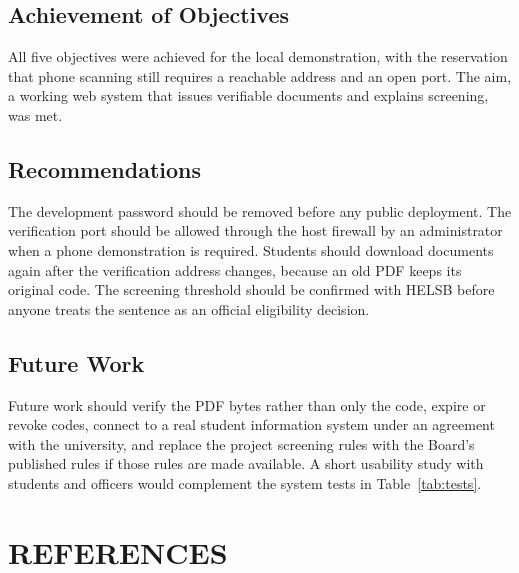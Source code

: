 \documentclass[12pt,a4paper]{report}
\begin{document}
\section{Achievement of Objectives}
All five objectives were achieved for the local demonstration, with the reservation that phone scanning still requires a reachable address and an open port. The aim, a working web system that issues verifiable documents and explains screening, was met.

\section{Recommendations}
The development password should be removed before any public deployment. The verification port should be allowed through the host firewall by an administrator when a phone demonstration is required. Students should download documents again after the verification address changes, because an old PDF keeps its original code. The screening threshold should be confirmed with HELSB before anyone treats the sentence as an official eligibility decision.

\section{Future Work}
Future work should verify the PDF bytes rather than only the code, expire or revoke codes, connect to a real student information system under an agreement with the university, and replace the project screening rules with the Board's published rules if those rules are made available. A short usability study with students and officers would complement the system tests in Table~\ref{tab:tests}.

\clearpage
\chapter*{REFERENCES}
\end{document}
